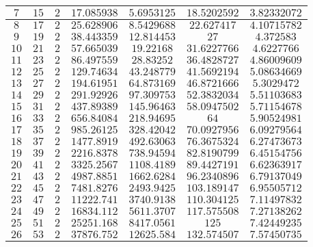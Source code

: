 \documentclass[10pt,a4paper]{article}
\begin{document}
\begin{enumerate}[1.]
\begin{center}
\begin{longtable}{|c|c|c|c|c|c|c|}
        $7$ & $15$ & $2$ & $17.085938$ & $5.6953125$ & $18.5202592$ & $3.82332072$\\ \hline
        $8$ & $17$ & $2$ & $25.628906$ & $8.5429688$ & $22.627417$ & $4.10715782$\\ \hline
        $9$ & $19$ & $2$ & $38.443359$ & $12.814453$ & $27$ & $4.372583$\\ \hline
        $10$ & $21$ & $2$ & $57.665039$ & $19.22168$ & $31.6227766$ & $4.6227766$\\ \hline
        $11$ & $23$ & $2$ & $86.497559$ & $28.83252$ & $36.4828727$ & $4.86009609$\\ \hline
        $12$ & $25$ & $2$ & $129.74634$ & $43.248779$ & $41.5692194$ & $5.08634669$\\ \hline
        $13$ & $27$ & $2$ & $194.61951$ & $64.873169$ & $46.8721666$ & $5.3029472$\\ \hline
        $14$ & $29$ & $2$ & $291.92926$ & $97.309753$ & $52.3832034$ & $5.51103683$\\ \hline
        $15$ & $31$ & $2$ & $437.89389$ & $145.96463$ & $58.0947502$ & $5.71154678$\\ \hline
        $16$ & $33$ & $2$ & $656.84084$ & $218.94695$ & $64$ & $5.90524981$\\ \hline
        $17$ & $35$ & $2$ & $985.26125$ & $328.42042$ & $70.0927956$ & $6.09279564$\\ \hline
        $18$ & $37$ & $2$ & $1477.8919$ & $492.63063$ & $76.3675324$ & $6.27473673$\\ \hline
        $19$ & $39$ & $2$ & $2216.8378$ & $738.94594$ & $82.8190799$ & $6.45154756$\\ \hline
        $20$ & $41$ & $2$ & $3325.2567$ & $1108.4189$ & $89.4427191$ & $6.62363917$\\ \hline
        $21$ & $43$ & $2$ & $4987.8851$ & $1662.6284$ & $96.2340896$ & $6.79137049$\\ \hline
        $22$ & $45$ & $2$ & $7481.8276$ & $2493.9425$ & $103.189147$ & $6.95505712$\\ \hline
        $23$ & $47$ & $2$ & $11222.741$ & $3740.9138$ & $110.304125$ & $7.11497832$\\ \hline
        $24$ & $49$ & $2$ & $16834.112$ & $5611.3707$ & $117.575508$ & $7.27138262$\\ \hline
        $25$ & $51$ & $2$ & $25251.168$ & $8417.0561$ & $125$ & $7.42449235$\\ \hline
        $26$ & $53$ & $2$ & $37876.752$ & $12625.584$ & $132.574507$ & $7.57450735$\\ \hline

\end{longtable}
\end{center}
\end{enumerate}
\end{document}
